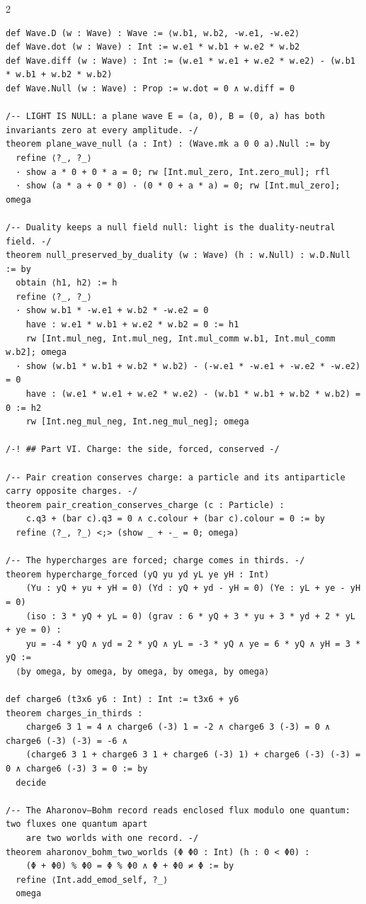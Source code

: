 \documentclass[10pt]{article}
\begin{document}
\begin{multicols}{2}
\begin{Verbatim}[fontsize=\fontsize{6.0}{6.9}\selectfont,breaklines,breakanywhere,breaksymbolleft={}]
def Wave.D (w : Wave) : Wave := ⟨w.b1, w.b2, -w.e1, -w.e2⟩
def Wave.dot (w : Wave) : Int := w.e1 * w.b1 + w.e2 * w.b2
def Wave.diff (w : Wave) : Int := (w.e1 * w.e1 + w.e2 * w.e2) - (w.b1 * w.b1 + w.b2 * w.b2)
def Wave.Null (w : Wave) : Prop := w.dot = 0 ∧ w.diff = 0

/-- LIGHT IS NULL: a plane wave E = (a, 0), B = (0, a) has both invariants zero at every amplitude. -/
theorem plane_wave_null (a : Int) : (Wave.mk a 0 0 a).Null := by
  refine ⟨?_, ?_⟩
  · show a * 0 + 0 * a = 0; rw [Int.mul_zero, Int.zero_mul]; rfl
  · show (a * a + 0 * 0) - (0 * 0 + a * a) = 0; rw [Int.mul_zero]; omega

/-- Duality keeps a null field null: light is the duality-neutral field. -/
theorem null_preserved_by_duality (w : Wave) (h : w.Null) : w.D.Null := by
  obtain ⟨h1, h2⟩ := h
  refine ⟨?_, ?_⟩
  · show w.b1 * -w.e1 + w.b2 * -w.e2 = 0
    have : w.e1 * w.b1 + w.e2 * w.b2 = 0 := h1
    rw [Int.mul_neg, Int.mul_neg, Int.mul_comm w.b1, Int.mul_comm w.b2]; omega
  · show (w.b1 * w.b1 + w.b2 * w.b2) - (-w.e1 * -w.e1 + -w.e2 * -w.e2) = 0
    have : (w.e1 * w.e1 + w.e2 * w.e2) - (w.b1 * w.b1 + w.b2 * w.b2) = 0 := h2
    rw [Int.neg_mul_neg, Int.neg_mul_neg]; omega

/-! ## Part VI. Charge: the side, forced, conserved -/

/-- Pair creation conserves charge: a particle and its antiparticle carry opposite charges. -/
theorem pair_creation_conserves_charge (c : Particle) :
    c.q3 + (bar c).q3 = 0 ∧ c.colour + (bar c).colour = 0 := by
  refine ⟨?_, ?_⟩ <;> (show _ + -_ = 0; omega)

/-- The hypercharges are forced; charge comes in thirds. -/
theorem hypercharge_forced (yQ yu yd yL ye yH : Int)
    (Yu : yQ + yu + yH = 0) (Yd : yQ + yd - yH = 0) (Ye : yL + ye - yH = 0)
    (iso : 3 * yQ + yL = 0) (grav : 6 * yQ + 3 * yu + 3 * yd + 2 * yL + ye = 0) :
    yu = -4 * yQ ∧ yd = 2 * yQ ∧ yL = -3 * yQ ∧ ye = 6 * yQ ∧ yH = 3 * yQ :=
  ⟨by omega, by omega, by omega, by omega, by omega⟩

def charge6 (t3x6 y6 : Int) : Int := t3x6 + y6
theorem charges_in_thirds :
    charge6 3 1 = 4 ∧ charge6 (-3) 1 = -2 ∧ charge6 3 (-3) = 0 ∧ charge6 (-3) (-3) = -6 ∧
    (charge6 3 1 + charge6 3 1 + charge6 (-3) 1) + charge6 (-3) (-3) = 0 ∧ charge6 (-3) 3 = 0 := by
  decide

/-- The Aharonov–Bohm record reads enclosed flux modulo one quantum: two fluxes one quantum apart
    are two worlds with one record. -/
theorem aharonov_bohm_two_worlds (Φ Φ0 : Int) (h : 0 < Φ0) :
    (Φ + Φ0) % Φ0 = Φ % Φ0 ∧ Φ + Φ0 ≠ Φ := by
  refine ⟨Int.add_emod_self, ?_⟩
  omega


\end{Verbatim}
\end{multicols}
\end{document}
